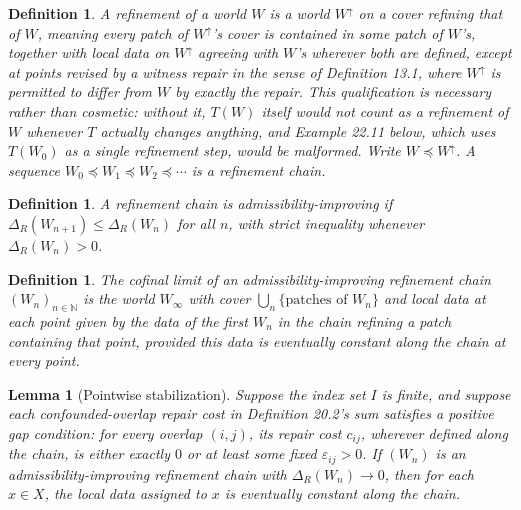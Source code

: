 \documentclass[11pt]{book}
\newtheorem{definition}[theorem]{Definition}
\newtheorem{lemma}[theorem]{Lemma}
\begin{document}
\begin{definition}
A \emph{refinement} of a world $W$ is a world $W^\uparrow$ on a cover refining that of $W$, meaning every patch of $W^\uparrow$'s cover is contained in some patch of $W$'s, together with local data on $W^\uparrow$ agreeing with $W$'s wherever both are defined, \emph{except} at points revised by a witness repair in the sense of Definition 13.1, where $W^\uparrow$ is permitted to differ from $W$ by exactly the repair. This qualification is necessary rather than cosmetic: without it, $T(W)$ itself would not count as a refinement of $W$ whenever $T$ actually changes anything, and Example 22.11 below, which uses $T(W_0)$ as a single refinement step, would be malformed. Write $W \preceq W^\uparrow$. A sequence $W_0 \preceq W_1 \preceq W_2 \preceq \cdots$ is a \emph{refinement chain}.
\end{definition}

\begin{definition}
A refinement chain is \emph{admissibility-improving} if $\Delta_R(W_{n+1}) \leq \Delta_R(W_n)$ for all $n$, with strict inequality whenever $\Delta_R(W_n) > 0$.
\end{definition}

\begin{definition}
The \emph{cofinal limit} of an admissibility-improving refinement chain $(W_n)_{n \in \mathbb N}$ is the world $W_\infty$ with cover $\bigcup_n \{ \text{patches of } W_n \}$ and local data at each point given by the data of the first $W_n$ in the chain refining a patch containing that point, provided this data is eventually constant along the chain at every point.
\end{definition}

\begin{lemma}[Pointwise stabilization]
Suppose the index set $I$ is finite, and suppose each confounded-overlap repair cost in Definition 20.2's sum satisfies a positive gap condition: for every overlap $(i,j)$, its repair cost $c_{ij}$, wherever defined along the chain, is either exactly $0$ or at least some fixed $\varepsilon_{ij} > 0$. If $(W_n)$ is an admissibility-improving refinement chain with $\Delta_R(W_n) \to 0$, then for each $x \in X$, the local data assigned to $x$ is eventually constant along the chain.
\end{lemma}
\end{document}
